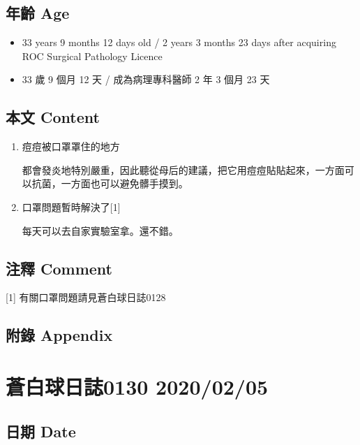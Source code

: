 \documentclass[
]{article}
\providecommand{\tightlist}{%
  \setlength{\itemsep}{0pt}\setlength{\parskip}{0pt}}
\begin{document}
\hypertarget{ux5e74ux9f61-age-65}{%
\subsection{年齡 Age}\label{ux5e74ux9f61-age-65}}

\begin{itemize}
\tightlist
\item
  33 years 9 months 12 days old / 2 years 3 months 23 days after
  acquiring ROC Surgical Pathology Licence
\item
  33 歲 9 個月 12 天 / 成為病理專科醫師 2 年 3 個月 23 天
\end{itemize}

\hypertarget{ux672cux6587-content-65}{%
\subsection{本文 Content}\label{ux672cux6587-content-65}}

\begin{enumerate}
\def\labelenumi{\arabic{enumi}.}
\item
  痘痘被口罩罩住的地方

  都會發炎地特別嚴重，因此聽從母后的建議，把它用痘痘貼貼起來，一方面可以抗菌，一方面也可以避免髒手摸到。
\item
  口罩問題暫時解決了{[}1{]}

  每天可以去自家實驗室拿。還不錯。
\end{enumerate}

\hypertarget{ux6ce8ux91cb-comment-64}{%
\subsection{注釋 Comment}\label{ux6ce8ux91cb-comment-64}}

{[}1{]} 有關口罩問題請見蒼白球日誌0128

\hypertarget{ux9644ux9304-appendix-65}{%
\subsection{附錄 Appendix}\label{ux9644ux9304-appendix-65}}

\hypertarget{ux84bcux767dux7403ux65e5ux8a8c0130-20200205}{%
\section{蒼白球日誌0130
2020/02/05}\label{ux84bcux767dux7403ux65e5ux8a8c0130-20200205}}

\hypertarget{ux65e5ux671f-date-66}{%
\subsection{日期 Date}\label{ux65e5ux671f-date-66}}
\end{document}
